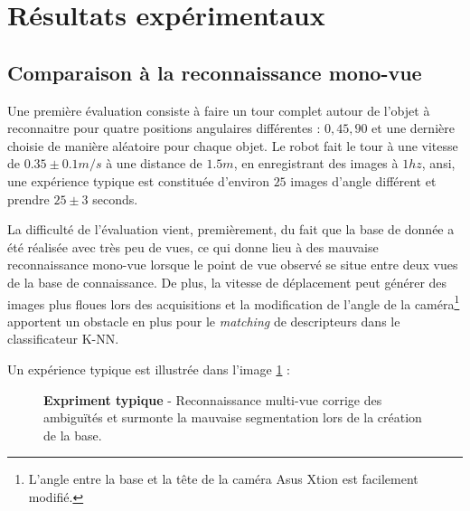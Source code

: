 \section{Résultats expérimentaux}
\subsection{Comparaison à la reconnaissance mono-vue}
Une première évaluation consiste à faire un tour complet autour de l'objet à reconnaitre pour quatre positions angulaires différentes : $0, 45, 90$ et une dernière choisie de manière aléatoire pour chaque objet. Le robot fait le tour à une vitesse de $0.35 \pm 0.1 m/s$ à une distance de $1.5m$, en enregistrant des images à $1hz$, ansi, une expérience typique est constituée d'environ $25$  images d'angle différent et prendre $25 \pm 3$ seconds. 

La difficulté de l'évaluation vient, premièrement, du fait que la base de donnée a été réalisée avec très peu de vues, ce qui donne lieu à des mauvaise reconnaissance mono-vue lorsque le point de vue observé se situe entre deux vues de la base de connaissance. De plus, la vitesse de déplacement peut générer des images plus floues lors des acquisitions et la modification de l'angle de la caméra\footnote{L'angle entre la base et la tête de la caméra Asus Xtion est facilement modifié.} apportent un obstacle en plus pour le \textit{matching} de descripteurs dans le classificateur K-NN.

Un expérience typique est illustrée dans l'image \ref{fig:resultats_expe} :

\begin{figure}[H]
			\caption{\textbf{Expriment typique} - Reconnaissance multi-vue corrige des ambiguïtés et surmonte la mauvaise segmentation lors de la création de la base.}
	\label{fig:resultats_expe}
\end{figure}

